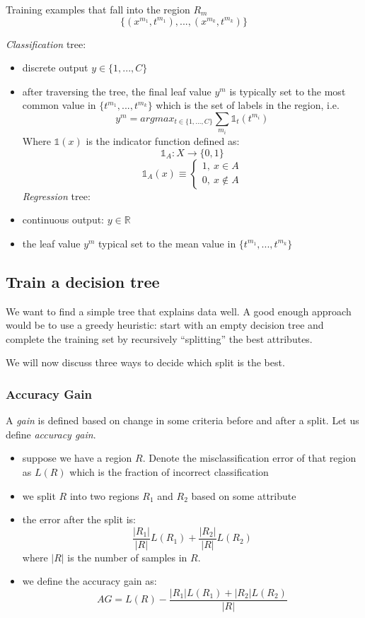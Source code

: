 \documentclass{article}
\begin{document}
Training examples that fall into the region \(R_m\)
\[\{ (x^{m_1}, t^{m_1}),...,(x^{m_k}, t^{m_k}) \}\]

\emph{Classification} tree:

\begin{itemize}
\item
  discrete output \(y \in \{1, ..., C\}\)
\item
  after traversing the tree, the final leaf value \(y^m\) is typically
  set to the most common value in \(\{t^{m_1}, ..., t^{m_k}\}\) which is
  the set of labels in the region, i.e.
  \[y^m = argmax_{t\in \{ 1, ..., C \}} \sum_{m_i}\mathbb{1}_{t} (t^{m_i}) \]
  Where \(\mathbb{1} (x)\) is the indicator function defined as:
  \[\mathbb{1}_A: X\rightarrow \{ 0, 1 \}\] \[\mathbb{1}_A(x) \equiv
  \begin{cases}
  1,\ x\in A \\
  0,\ x \notin A
  \end{cases}\] \emph{Regression} tree:
\item
  continuous output: \(y\in \mathbb{R}\)
\item
  the leaf value \(y^m\) typical set to the mean value in
  \(\{t^{m_1},...,t^{m_k}\}\)
\end{itemize}

\subsection{Train a decision tree}\label{train-a-decision-tree}

We want to find a simple tree that explains data well. A good enough
approach would be to use a greedy heuristic: start with an empty
decision tree and complete the training set by recursively ``splitting''
the best attributes.

We will now discuss three ways to decide which split is the best.

\subsubsection{Accuracy Gain}\label{accuracy-gain}

A \emph{gain} is defined based on change in some criteria before and
after a split. Let us define \emph{accuracy gain}.

\begin{itemize}
\tightlist
\item
  suppose we have a region \(R\). Denote the misclassification error of
  that region as \(L(R)\) which is the fraction of incorrect
  classification
\item
  we split \(R\) into two regions \(R_1\) and \(R_2\) based on some
  attribute
\item
  the error after the split is:
  \[\frac{|R_1|}{|R|}L(R_1) + \frac{|R_2|}{|R|}L(R_2)\] where \(|R|\) is
  the number of samples in \(R\).
\item
  we define the accuracy gain as:
  \[AG = L(R) - \frac{|R_1| L(R_1) + |R_2|L(R_2)}{|R|}\]
\end{itemize}
\end{document}

